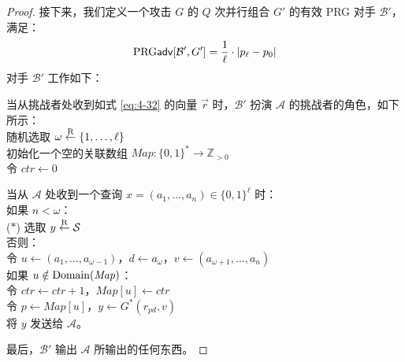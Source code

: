 \begin{proof}
接下来，我们定义一个攻击 $G$ 的 $Q$ 次并行组合 $G'$ 的有效 PRG 对手 $\mathcal{B}'$，满足：
\[
{\rm PRG}\mathsf{adv}[\mathcal{B}',G']
=
\frac{1}{\ell}
\cdot
|p_\ell-p_0|
\]
对手 $\mathcal{B}'$ 工作如下：

\vspace{10pt}

\hspace*{5pt} 当从挑战者处收到如式 \ref{eq:4-32} 的向量 $\vec r$ 时，$\mathcal{B}'$ 扮演 $\mathcal{A}$ 的挑战者的角色，如下所示：\\
\hspace*{50pt} 随机选取 $\omega\overset{\rm R}\leftarrow\{1,\dots,\ell\}$\\
\hspace*{50pt} 初始化一个空的关联数组 $\mathit{Map}:\{0,1\}^*\to\mathbb{Z}_{>0}$\\
\hspace*{50pt} 令 $\mathit{ctr}\leftarrow 0$

\vspace{5pt}

\hspace*{29pt} 当从 $\mathcal{A}$ 处收到一个查询 $x=(a_1,\dots,a_n)\in\{0,1\}^\ell$ 时：\\
\hspace*{75pt} 如果 $n<\omega$：\\
\hspace*{11pt} ($*$)
\hspace*{69pt} 选取 $y\overset{\rm R}\leftarrow\mathcal{S}$\\
\hspace*{75pt} 否则：\\
\hspace*{100pt} 令 $u\leftarrow(a_1,\dots,a_{\omega-1})$，$d\leftarrow a_\omega$，$v\leftarrow(a_{\omega+1},\dots,a_n)$\\
\hspace*{100pt} 如果 $u\notin{\rm Domain}(\mathit{Map})$：\\
\hspace*{125pt} 令 $\mathit{ctr}\leftarrow\mathit{ctr}+1$，$\mathit{Map}[u]\leftarrow\mathit{ctr}$\\
\hspace*{100pt} 令 $p\leftarrow \mathit{Map}[u]$，$y\leftarrow G^*(r_{pd},v)$\\
\hspace*{75pt} 将 $y$ 发送给 $\mathcal{A}$。

\vspace{5pt}

\hspace*{5pt} 最后，$\mathcal{B}'$ 输出 $\mathcal{A}$ 所输出的任何东西。


\end{proof}
